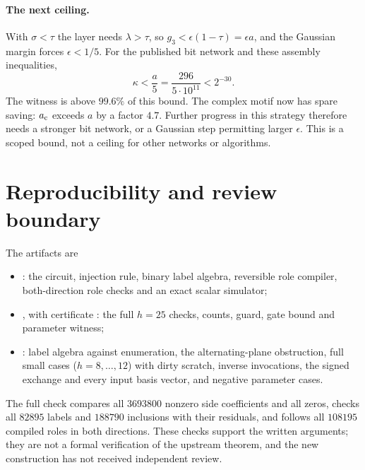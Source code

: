 \documentclass[11pt]{article}
\begin{document}
\paragraph{The next ceiling.}
With $\sigma<\tau$ the layer needs $\lambda>\tau$, so
$g_3<\epsilon(1-\tau)=\epsilon a$, and the Gaussian margin forces
$\epsilon<1/5$. For the published bit network and these assembly inequalities,
\[
 \kappa<\frac a5=\frac{296}{5\cdot10^{11}}<2^{-30}.
\]
The witness is above $99.6\%$ of this bound. The complex motif now has
spare saving: $a_{\rm c}$ exceeds $a$ by a factor $4.7$. Further progress in
this strategy therefore needs a stronger bit network, or a Gaussian step
permitting larger $\epsilon$. This is a scoped bound, not a ceiling for other
networks or algorithms.

\section{Reproducibility and review boundary}
The artifacts are
\begin{itemize}
\item {}: the circuit, injection rule, binary
label algebra, reversible role compiler, both-direction role checks and an
exact scalar simulator;
\item {}, with certificate
\newline{}: the full $h=25$ checks,
counts, guard, gate bound and parameter witness;
\item {}: label algebra against
enumeration, the alternating-plane obstruction, full small cases
($h=8,\ldots,12$) with dirty scratch, inverse invocations, the signed exchange
and every input basis vector, and negative parameter cases.
\end{itemize}
The full check compares all $3693800$ nonzero side coefficients and all
zeros, checks all $82895$ labels and $188790$ inclusions with their residuals,
and follows all $108195$ compiled roles in both directions. These checks
support the written arguments; they are not a formal verification of the
upstream theorem, and the new construction has not received independent
review.
\end{document}
